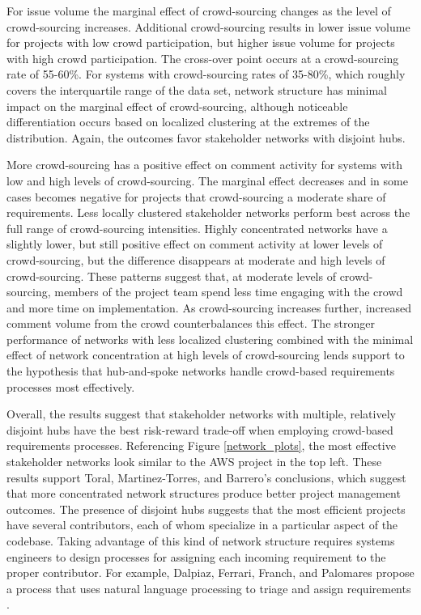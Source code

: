 For issue volume the marginal effect of crowd-sourcing changes as the level of crowd-sourcing increases. Additional crowd-sourcing results in lower issue volume for projects with low crowd participation, but higher issue volume for projects with high crowd participation. The cross-over point occurs at a crowd-sourcing rate of 55-60\%. For systems with crowd-sourcing rates of 35-80\%, which roughly covers the interquartile range of the data set, network structure has minimal impact on the marginal effect of crowd-sourcing, although noticeable differentiation occurs based on localized clustering at the extremes of the distribution. Again, the outcomes favor stakeholder networks with disjoint hubs.

More crowd-sourcing has a positive effect on comment activity for systems with low and high levels of crowd-sourcing. The marginal effect decreases and in some cases becomes negative for projects that crowd-sourcing a moderate share of requirements. Less locally clustered stakeholder networks perform best across the full range of crowd-sourcing intensities. Highly concentrated networks have a slightly lower, but still positive effect on comment activity at lower levels of crowd-sourcing, but the difference disappears at moderate and high levels of crowd-sourcing. These patterns suggest that, at moderate levels of crowd-sourcing, members of the project team spend less time engaging with the crowd and more time on implementation. As crowd-sourcing increases further, increased comment volume from the crowd counterbalances this effect. The stronger performance of networks with less localized clustering combined with the minimal effect of network concentration at high levels of crowd-sourcing lends support to the hypothesis that hub-and-spoke networks handle crowd-based requirements processes most effectively.

Overall, the results suggest that stakeholder networks with multiple, relatively disjoint hubs have the best risk-reward trade-off when employing crowd-based requirements processes. Referencing Figure \ref{network_plots}, the most effective stakeholder networks look similar to the AWS project in the top left. These results support Toral, Martinez-Torres, and Barrero's \cite{toral} conclusions, which suggest that more concentrated network structures produce better project management outcomes. The presence of disjoint hubs suggests that the most efficient projects have several contributors, each of whom specialize in a particular aspect of the codebase. Taking advantage of this kind of network structure requires systems engineers to design processes for assigning each incoming requirement to the proper contributor. For example, Dalpiaz, Ferrari, Franch, and Palomares propose a process that uses natural language processing to triage and assign requirements \cite{dalpiaz}.

